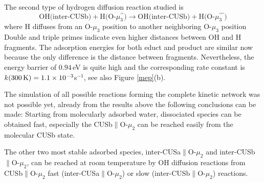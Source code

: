 \documentclass[11pt,DIV=13,BCOR=5mm,a4paper,headinclude]{scrbook}
\begin{document}
The second type of hydrogen diffusion reaction studied is
\begin{equation}
 \text{OH(inter-CUSb)} + \text{H(O-$\mu_3^{\prime\prime}$)} \rightarrow \text{OH(inter-CUSb)} + \text{H(O-$\mu_3^{\prime\prime\prime}$)} \tag{Df-H-VI}
     \label{diffHd}
\end{equation}
where H diffuses from an O-$\mu_3$ position to another neighboring O-$\mu_3$ position
Double and triple primes indicate even higher distances between OH and H fragments.
The adsorption energies for both educt and product are similar now because the only difference is the distance between fragments.
Nevertheless, the energy barrier of $0.94\,$eV is quite high and the corresponding rate constant is $k(\textrm{300\,K})=1.1\times 10^{-3}$s$^{-1}$, see also Figure \ref{mep}(b).
% 

The simulation of all possible reactions forming the complete kinetic network was not possible yet, already from the results above the following conclusions can be made:
Starting from molecularly adsorbed water, dissociated species can be obtained fast, especially the CUSb$\parallel$O-$\mu_2$ can be reached easily from the molecular CUSb state.

The other two most stable adsorbed species, inter-CUSa$\parallel$O-$\mu_2$ and inter-CUSb$\parallel$O-$\mu_2$, can be reached at room temperature by OH diffusion reactions from CUSb$\parallel$O-$\mu_2$ fast (inter-CUSa$\parallel$O-$\mu_2$) or slow (inter-CUSb$\parallel$O-$\mu_2$) reactions.
\end{document}
